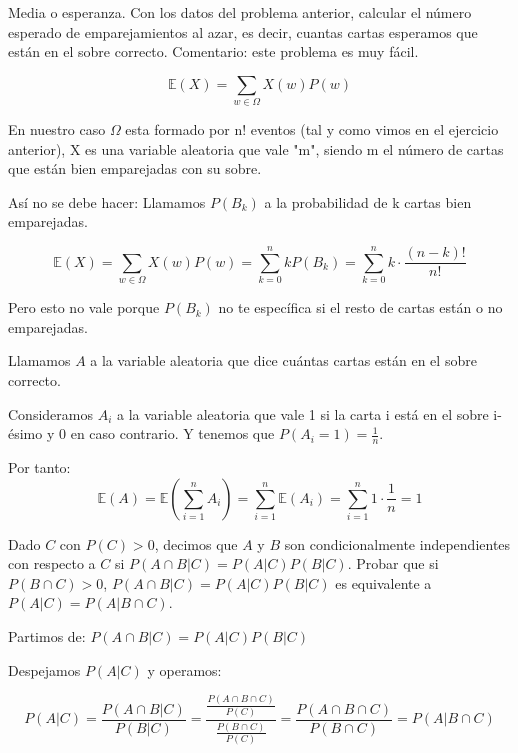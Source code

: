 \begin{problem}[12] Media o esperanza. Con los datos del problema anterior, calcular el n\'umero esperado de
emparejamientos al azar, es decir, cuantas cartas esperamos que est\'an en el sobre correcto.
Comentario: este problema es muy f\'acil.
\solution

\begin{expla}
\[
\mathbb{E}(X) = \sum_{w \in \Omega} X(w)P(w)
\]

En nuestro caso $\Omega$ esta formado por n! eventos (tal y como vimos en el ejercicio anterior), X es una variable aleatoria que vale "m", siendo m el número de cartas que están bien emparejadas con su sobre.

Así no se debe hacer: 
Llamamos $P(B_k)$ a la probabilidad de k cartas bien emparejadas. 

\[
\mathbb{E}(X) = \sum_{w \in \Omega} X(w)P(w) = \sum_{k=0}^n kP(B_k) = \sum_{k=0}^n k\cdot\frac{(n-k)!}{n!}
\]

Pero esto no vale porque $P(B_k)$ no te específica si el resto de cartas están o no emparejadas.
\end{expla}
Llamamos $A$ a la variable aleatoria que dice cuántas cartas están en el sobre correcto.

Consideramos $A_i$ a la variable aleatoria que vale 1 si la carta i está en el sobre i-ésimo y 0 en caso contrario. Y tenemos que $P(A_i=1)=\frac{1}{n}$.

Por tanto:
\[
\mathbb{E}(A)=\mathbb{E}({\sum_{i=1}^{n} A_i}) = \sum_{i=1}^n \mathbb{E}(A_i) = \sum_{i=1}^n 1 \cdot \frac{1}{n} = 1
\]




\end{problem}


\begin{problem}[13] Dado $C$ con $P(C) > 0$, decimos que $A$ y $B$ son condicionalmente independientes
con respecto a $C$ si $P(A\cap B|C) =P(A|C) P(B|C)$. Probar que si  $P(B\cap C) > 0$, 
$P(A\cap B|C) =P(A|C) P(B|C)$ es equivalente a $P(A|C) = P(A|B \cap C)$. 


\solution

\begin{expla}
Partimos de: $P(A\cap B|C)=P(A|C)P(B|C)$  

Despejamos $P(A|C)$ y operamos:
\end{expla}

\[
P(A|C)=\frac{P(A\cap B|C)}{P(B|C)}=\frac{\frac{P(A\cap B\cap C)}{P(C)}}{\frac{P(B \cap C)}{P(C)}}=\frac{P(A \cap B\cap C)}{P(B\cap C)}=P(A|B\cap C)
\]

\end{problem}

